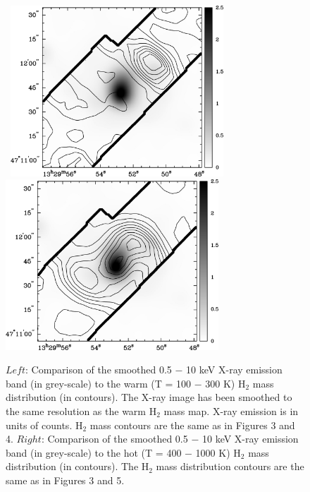 \documentclass[manuscript]{aastex}
\begin{document}
\begin{figure}[!t]
\centerline{\hbox{ \hspace{0.0in} 
\includegraphics[width=8cm,angle=0]{x_v_cold.jpg}
\hspace{0.1in}
\includegraphics[width=8cm,angle=0]{x_v_warm.jpg}}}
\caption{$Left$:  Comparison of the smoothed 0.5 $-$ 10 keV X-ray emission band (in grey-scale) to the warm (T = 100 $-$ 300 K) $\mathrm{H_2}$ mass distribution (in contours).   The X-ray image has been smoothed to the same resolution as the warm $\mathrm{H_2}$ mass map.  X-ray emission is in units of counts.  $\mathrm{H_2}$ mass contours are the same as in Figures 3 and 4.  $Right$: Comparison of the smoothed 0.5 $-$ 10 keV X-ray emission band (in grey-scale) to the hot (T = 400 $-$ 1000 K) $\mathrm{H_2}$ mass distribution (in contours).  The $\mathrm{H_2}$ mass distribution contours are the same as in Figures 3 and 5.\label{fig10}}
\end{figure}

\clearpage
\end{document}
